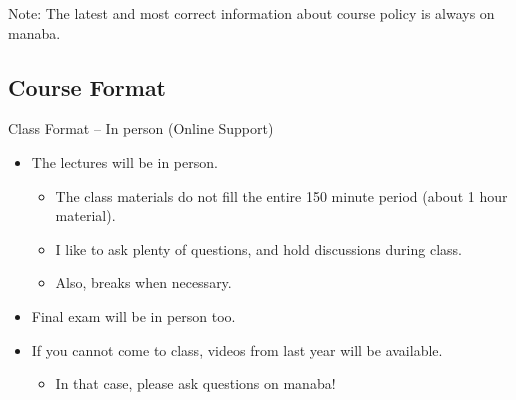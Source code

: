 \documentclass[aspectratio=169]{beamer}
\begin{document}
\begin{CJK}{UTF8}{ipxm}
\begin{frame}
  \alert{Note}: The latest and most correct information about course policy is always on manaba.
\end{frame}

\subsection{Course Format}
\begin{frame}[t]{Class Format -- In person (Online Support)}
  \begin{itemize}
  \item The lectures will be in person.
    \begin{itemize}
    \item The class materials do not fill the entire 150 minute period (about 1 hour material).
    \item I like to ask plenty of questions, and hold discussions during class.
    \item Also, breaks when necessary.
    \end{itemize}
  \item Final exam will be in person too.
  \item If you cannot come to class, videos from last year will be available.
    \begin{itemize}
    \item In that case, please ask questions on manaba!
    \end{itemize}
  \end{itemize}
\end{frame}


\end{CJK}
\end{document}
